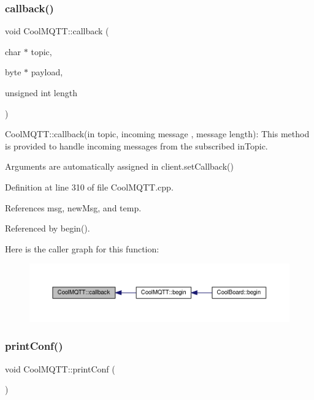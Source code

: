 \subsubsection{\texorpdfstring{callback()}{callback()}}
{\footnotesize\ttfamily void Cool\+M\+Q\+T\+T\+::callback (\begin{DoxyParamCaption}\item[{char $\ast$}]{topic,  }\item[{byte $\ast$}]{payload,  }\item[{unsigned int}]{length }\end{DoxyParamCaption})}

Cool\+M\+Q\+T\+T\+::callback(in topic, incoming message , message length)\+: This method is provided to handle incoming messages from the subscribed in\+Topic.

Arguments are automatically assigned in client.\+set\+Callback() 

Definition at line 310 of file Cool\+M\+Q\+T\+T.\+cpp.



References msg, new\+Msg, and temp.



Referenced by begin().

Here is the caller graph for this function\+:\nopagebreak
\begin{figure}[H]
\begin{center}
\leavevmode
\includegraphics[width=350pt]{d0/dd0/class_cool_m_q_t_t_a30d82ad665bfb603f46ecdbc290775df_icgraph}
\end{center}
\end{figure}
\mbox{\label{class_cool_m_q_t_t_a40553a0ad4b5ecf1cb4411ab54ca85fb}} 
\subsubsection{\texorpdfstring{print\+Conf()}{printConf()}}
{\footnotesize\ttfamily void Cool\+M\+Q\+T\+T\+::print\+Conf (\begin{DoxyParamCaption}{ }\end{DoxyParamCaption})}

